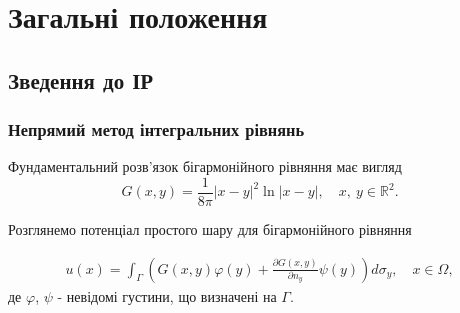 \documentclass[10pt]{beamer}
\begin{document}
\section{Загальні положення}
\subsection{Зведення до ІР}

\begin{frame}
\frametitle{Непрямий метод інтегральних рівнянь}

Фундаментальний розв'язок бігармонійного рівняння має вигляд
\begin{equation}
	G(x, y)=\frac{1}{8\pi}|x-y|^2\ln|x-y|, \quad x,\ y \in \mathbb{R}^2.
\end{equation}

Розглянемо потенціал простого шару для бігармонійного рівняння

\begin{gather}
 \label{w}
 	 u(x)=\int_{\Gamma}(G(x,y)\varphi(y)+\frac{\partial G(x,y)}{\partial n_y}\psi(y))d\sigma_y, \quad x\in\Omega,
 \end{gather}
де $\varphi$, $\psi$ - невідомі густини, що визначені на $\Gamma$.

\end{frame}
\end{document}
